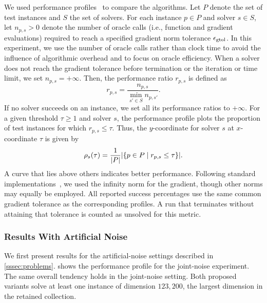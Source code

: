 \documentclass[journal_revised_MPC]{subfiles}
\begin{document}
We used performance profiles~\citep{dolanBenchmarkingOptimizationSoftware2002} to compare the algorithms.
Let $P$ denote the set of test instances and $S$ the set of solvers.
For each instance $p \in P$ and solver $s \in S$, let $n_{p,s} > 0$ denote the number of oracle calls (i.e., function and gradient evaluations) required to reach a specified gradient norm tolerance $\epsilon_{\mathrm{gtol}}$.
In this experiment, we use the number of oracle calls rather than clock time to avoid the influence of algorithmic overhead and to focus on oracle efficiency.
When a solver does not reach the gradient tolerance before termination or the iteration or time limit, we set $n_{p,s} = +\infty$.
Then, the performance ratio $r_{p,s}$ is defined as
\begin{equation*}
    r_{p,s} = \frac{n_{p,s}}{\min_{s' \in S} n_{p,s'}}.
\end{equation*}
If no solver succeeds on an instance, we set all its performance ratios to $+\infty$.
For a given threshold $\tau \geq 1$ and solver $s$, the performance profile plots the proportion of test instances for which $r_{p,s} \leq \tau$.
Thus, the $y$-coordinate for solver $s$ at $x$-coordinate $\tau$ is given by
\begin{equation*}
    \rho_s(\tau) = \frac{1}{\abs{P}} \abs{\left\{ p \in P \mathrel{}\middle|\mathrel{} r_{p,s} \leq \tau \right\}}.
\end{equation*}
A curve that lies above others indicates better performance.
Following standard implementations~\citep{2020SciPy-NMeth}, we used the infinity norm for the gradient, though other norms may equally be employed.
All reported success percentages use the same common gradient tolerance as the corresponding profiles.
A run that terminates without attaining that tolerance is counted as unsolved for this metric.

\subsubsection{Results With Artificial Noise}\label{sssec:noise_results}

We first present results for the artificial-noise settings described in \cref{sssec:problems}.
 shows the performance profile for the joint-noise experiment.
The same overall tendency holds in the joint-noise setting.
Both proposed variants solve at least one instance of dimension $123{,}200$, the largest dimension in the retained collection.
\end{document}
